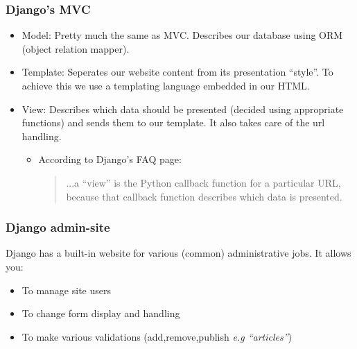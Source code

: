 \documentclass{beamer}
\begin{document}
\begin{frame}
  \frametitle{Django's MVC}
\begin{itemize}[<+->]
  \item Model: Pretty much the same as MVC. Describes our database using ORM (object relation mapper).
  \item Template: Seperates our website content from its presentation ``style''. To achieve this we use a templating language embedded in our HTML.
  \item View: Describes which data should be presented (decided using appropriate functions) and sends them to our template. It also takes care of the url handling.
    \begin{itemize}
      \item According to Django's FAQ page: \begin{quote}...a “view” is the Python callback function for a particular URL, because that callback function describes which data is presented. \end{quote}
    \end{itemize}
\end{itemize}
\end{frame}

\begin{frame}
  \frametitle{Django admin-site}
Django has a built-in website for various (common) administrative jobs. It allows you:
\begin{itemize}
  \item To manage site users
  \item To change form display and handling
  \item To make various validations (add,remove,publish \textit{e.g ``articles''})
\end{itemize}
\end{frame}
\end{document}

